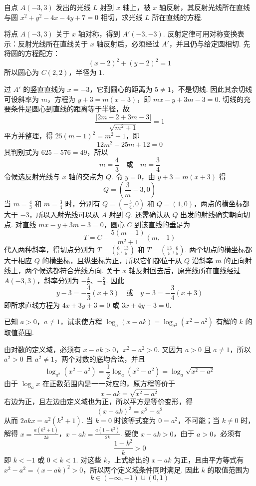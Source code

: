 \begin{problem}
自点 \(A(-3,3)\) 发出的光线 \(L\) 射到 \(x\) 轴上，被 \(x\) 轴反射，其反射光线所在直线与圆 \(x^2 + y^2 - 4x - 4y + 7 = 0\) 相切，求光线 \(L\) 所在直线的方程.
\end{problem}

\begin{solution}
将点 \(A(-3,3)\) 关于 \(x\) 轴对称，得到 \(A'(-3,-3)\). 反射定律可用对称变换表示：反射光线所在直线关于 \(x\) 轴反射后，必须经过 \(A'\)，并且仍与给定圆相切. 先将圆的方程配方：
\[
(x-2)^2+(y-2)^2=1
\]
所以圆心为 \(C(2,2)\)，半径为 \(1\).

过 \(A'\) 的竖直直线为 \(x=-3\)，它到圆心的距离为 \(5\neq1\)，不是切线. 因此其余切线可设斜率为 \(m\)，方程为 \(y+3=m(x+3)\)，即 \(mx-y+3m-3=0\). 切线的充要条件是圆心到直线的距离等于半径，故
\[
\frac{|2m-2+3m-3|}{\sqrt{m^2+1}}=1
\]
平方并整理，得 \(25(m-1)^2=m^2+1\)，即
\[
12m^2-25m+12=0
\]
其判别式为 \(625-576=49\)，所以
\[
m=\frac{4}{3}\quad\text{或}\quad m=\frac{3}{4}
\]
令候选反射光线与 \(x\) 轴的交点为 \(Q\). 令 \(y=0\)，由 \(y+3=m(x+3)\) 得
\[
Q=\left(\frac{3}{m}-3,0\right)
\]
当 \(m=\frac{4}{3}\) 和 \(m=\frac{3}{4}\) 时，分别有 \(Q=\left(-\frac{3}{4},0\right)\) 和 \(Q=(1,0)\)，两点的横坐标都大于 \(-3\)，所以入射光线可以从 \(A\) 射到 \(Q\). 还需确认从 \(Q\) 出发的射线确实朝向切点. 对直线 \(mx-y+3m-3=0\)，圆心 \(C\) 到该直线的垂足为
\[
T=C-\frac{5(m-1)}{m^2+1}(m,-1)
\]
代入两种斜率，得切点分别为 \(T=\left(\frac65,\frac{13}5\right)\) 和 \(T=\left(\frac{13}5,\frac65\right)\). 两个切点的横坐标都大于相应 \(Q\) 的横坐标，且纵坐标为正，所以它们都位于从 \(Q\) 沿斜率 \(m\) 的正向射线上，两个候选都符合光线方向. 关于 \(x\) 轴反射回去后，原光线所在直线经过 \(A(-3,3)\)，斜率分别为 \(-\frac43\)、\(-\frac34\). 因此
\[
y-3=-\frac{4}{3}(x+3)\quad\text{或}\quad y-3=-\frac{3}{4}(x+3)
\]
即所求直线方程为 \(4x+3y+3=0\) 或 \(3x+4y-3=0\).
\end{solution}

\begin{problem}
已知 \(a > 0\)，\(a \neq 1\)，试求使方程 \(\log_a(x - ak) = \log_{a^2}(x^2 - a^2)\) 有解的 \(k\) 的取值范围.
\end{problem}

\begin{solution}
由对数的定义域，必须有
\(x-ak>0\)，\(x^2-a^2>0\).
又因为 \(a>0\) 且 \(a\neq1\)，所以 \(a^2>0\) 且 \(a^2\neq1\)，两个对数的底均合法，并且
\[
\log_{a^2}(x^2-a^2)=\frac{1}{2}\log_a(x^2-a^2)=\log_a\sqrt{x^2-a^2}
\]
由于 \(\log_a x\) 在正数范围内是一一对应的，原方程等价于
\[
x-ak=\sqrt{x^2-a^2}
\]
右边为正，且左边由定义域也为正，所以平方是等价变形，得
\[
(x-ak)^2=x^2-a^2
\]
从而 \(2akx=a^2(k^2+1)\). 当 \(k=0\) 时该等式变为 \(0=a^2\)，不可能；当 \(k\neq0\) 时，解得
\(x=\frac{a(k^2+1)}{2k}\)，\(x-ak=\frac{a(1-k^2)}{2k}\).
要使 \(x-ak>0\)，由于 \(a>0\)，必须有
\[
\frac{1-k^2}{k}>0
\]
即 \(k<-1\) 或 \(0<k<1\). 对这些 \(k\)，上式给出的 \(x-ak\) 为正，且由平方等式有 \(x^2-a^2=(x-ak)^2>0\)，所以两个定义域条件同时满足. 因此 \(k\) 的取值范围为
\[
k\in(-\infty,-1)\cup(0,1)
\]
\end{solution}

